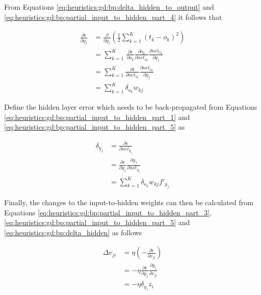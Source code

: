 From Equations \ref{eq:heuristics:gd:bp:delta_hidden_to_output} and \ref{eq:heuristics:gd:bp:partial_input_to_hidden_part_4} it follows that

\begin{equation}
      \label{eq:heuristics:gd:bp:partial_input_to_hidden_part_5}
      \begin{split}
            \frac{\partial \epsilon}{\partial y_{j}}
            &= \frac{\partial}{\partial y_{j}}\left( \frac{1}{2} \sum^{K}_{k=1} (t_{k} - o_{k})^{2} \right)\\
            &= \sum^{K}_{k=1}\frac{}{} \frac{\partial \epsilon}{\partial o_{k}} \frac{\partial o_{k}}{\partial net_{o_{k}}} \frac{\partial net_{o_{k}}}{\partial y_{j}}\\
            &= \sum^{K}_{k=1} \frac{\partial \epsilon}{\partial net_{o_{k}}} \frac{\partial net_{o_{k}}}{\partial y_{j}}\\
            &= \sum^{K}_{k=1} \delta_{o_{k}}w_{kj}
      \end{split}
\end{equation}

Define the hidden layer error which needs to be back-propagated from Equations \ref{eq:heuristics:gd:bp:partial_input_to_hidden_part_1} and \ref{eq:heuristics:gd:bp:partial_input_to_hidden_part_5} as

\begin{equation}
      \label{eq:heuristics:gd:bp:delta_hidden}
      \begin{split}
            \delta_{y_{j}}
            &= \frac{\partial \epsilon}{\partial net_{y_{j}}}\\
            &= \frac{\partial \epsilon}{\partial y_{j}} \frac{\partial y_{j}}{\partial net_{y_{j}}}\\
            &= \sum^{K}_{k=1}\delta_{o_{k}}w_{kj}f'_{y_{j}}
      \end{split}
\end{equation}

Finally, the changes to the input-to-hidden weights can then be calculated from Equations \ref{eq:heuristics:gd:bp:partial_input_to_hidden_part_3}, \ref{eq:heuristics:gd:bp:partial_input_to_hidden_part_5} and \ref{eq:heuristics:gd:bp:delta_hidden} as follows

\begin{equation}
      \label{eq:heuristics:gd:bp:delta_input_to_hidden}
      \begin{split}
            \Delta v_{ji}
            &= \eta \left( - \frac{\partial \epsilon}{\partial v_{ji}} \right)\\
            &= -\eta \frac{\partial \epsilon}{\partial y_{j}} \frac{\partial y_{j}}{\partial v_{ji}}\\
            &= -\eta \delta_{y_{j}}z_{i}
      \end{split}
\end{equation}

